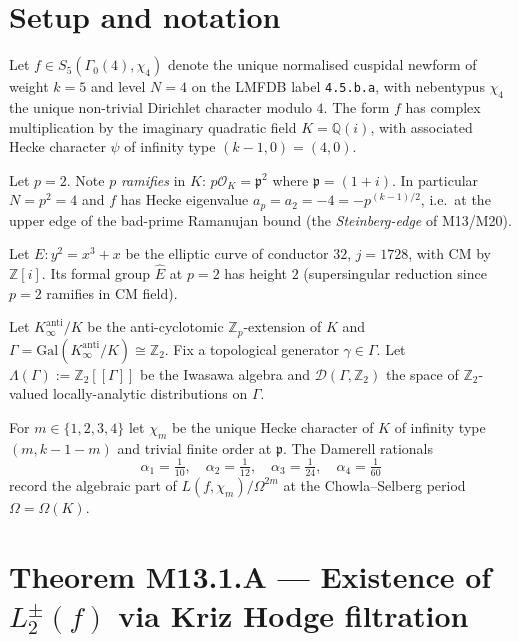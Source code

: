 
\section{Setup and notation}

Let $f \in S_5(\Gamma_0(4),\chi_4)$ denote the unique normalised cuspidal
newform of weight $k=5$ and level $N=4$ on the LMFDB label \texttt{4.5.b.a},
with nebentypus $\chi_4$ the unique non-trivial Dirichlet character modulo $4$.
The form $f$ has complex multiplication by the imaginary quadratic field
$K = \mathbb{Q}(i)$, with associated Hecke character $\psi$ of infinity type
$(k-1,0) = (4,0)$.

Let $p = 2$. Note $p$ \emph{ramifies} in $K$: $p\mathcal{O}_K = \mathfrak{p}^2$
where $\mathfrak{p} = (1+i)$. In particular $N = p^2 = 4$ and $f$ has Hecke
eigenvalue $a_p = a_2 = -4 = -p^{(k-1)/2}$, i.e.\ at the upper edge of the
bad-prime Ramanujan bound (the \emph{Steinberg-edge} of M13/M20).

Let $E:y^2 = x^3 + x$ be the elliptic curve of conductor $32$, $j=1728$,
with CM by $\mathbb{Z}[i]$. Its formal group $\hat{E}$ at $p=2$ has height
$2$ (supersingular reduction since $p=2$ ramifies in CM field).

Let $K_\infty^{\mathrm{anti}}/K$ be the anti-cyclotomic $\mathbb{Z}_p$-extension
of $K$ and $\Gamma = \mathrm{Gal}(K_\infty^{\mathrm{anti}}/K) \cong \mathbb{Z}_2$.
Fix a topological generator $\gamma \in \Gamma$. Let $\Lambda(\Gamma) :=
\mathbb{Z}_2[[\Gamma]]$ be the Iwasawa algebra and $\mathcal{D}(\Gamma,\mathbb{Z}_2)$
the space of $\mathbb{Z}_2$-valued locally-analytic distributions on $\Gamma$.

For $m \in \{1,2,3,4\}$ let $\chi_m$ be the unique Hecke character of $K$ of
infinity type $(m, k-1-m)$ and trivial finite order at $\mathfrak{p}$. The
Damerell rationals
\[
\alpha_1 = \tfrac{1}{10},\quad \alpha_2 = \tfrac{1}{12},\quad
\alpha_3 = \tfrac{1}{24},\quad \alpha_4 = \tfrac{1}{60}
\]
record the algebraic part of $L(f,\chi_m)/\Omega^{2m}$ at the
Chowla–Selberg period $\Omega = \Omega(K)$.

\section{Theorem M13.1.A — Existence of $L_2^\pm(f)$ via Kriz Hodge filtration}

